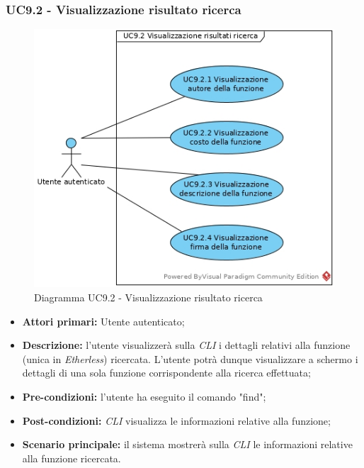 \subsubsection{UC9.2 - Visualizzazione risultato ricerca}
\begin{figure}[h]
	\centering
	\includegraphics[width=0.7\linewidth]{res/img/UC9.2.jpg}
	\caption{Diagramma UC9.2 - Visualizzazione risultato ricerca}
\end{figure}
\begin{itemize}
	\item \textbf{Attori primari:} Utente autenticato;
	\item \textbf{Descrizione:} l'utente visualizzerà sulla \textit{CLI\glo} i dettagli relativi alla funzione (unica in \textit{Etherless}) ricercata. L'utente potrà dunque visualizzare a schermo i dettagli di una sola funzione corrispondente alla ricerca effettuata;
	\item \textbf{Pre-condizioni:} l'utente ha eseguito il comando "find";
	\item \textbf{Post-condizioni:} \textit{CLI\glo} visualizza le informazioni relative alla funzione;
	\item \textbf{Scenario principale:} il sistema mostrerà sulla \textit{CLI\glo} le informazioni relative alla funzione ricercata.
\end{itemize}

